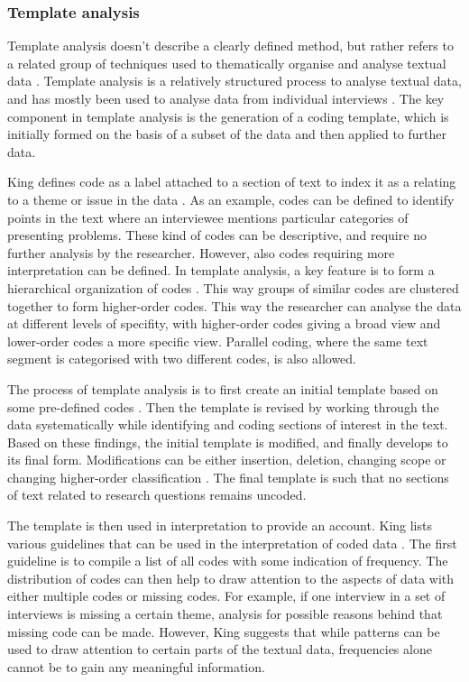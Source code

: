 \documentclass[english]{tktltiki2}
\theoremstyle{definition}
\theoremstyle{remark}
\begin{document}
\subsubsection{Template analysis}

Template analysis doesn't describe a clearly defined method, but rather refers to a related group of techniques used to thematically organise and analyse textual data \cite{king2004using}. Template analysis is a relatively structured process to analyse textual data, and has mostly been used to analyse data from individual interviews \cite{king2012doing}. The key component in template analysis is the generation of a coding template, which is initially formed on the basis of a subset of the data and then applied to further data. 

King defines code as a label attached to a section of text to index it as a relating to a theme or issue in the data \cite{king2004using}. As an example, codes can be defined to identify points in the text where an interviewee mentions particular categories of presenting problems. These kind of codes can be descriptive, and require no further analysis by the researcher. However, also codes requiring more interpretation can be defined. In template analysis, a key feature is to form a hierarchical organization of codes \cite{king2004using}. This way groups of similar codes are clustered together to form higher-order codes. This way the researcher can analyse the data at different levels of specifity, with higher-order codes giving a broad view and lower-order codes a more specific view. Parallel coding, where the same text segment is categorised with two different codes, is also allowed. 

The process of template analysis is to first create an initial template based on some pre-defined codes \cite{king2004using}. Then the template is revised by working through the data systematically while identifying and coding sections of interest in the text. Based on these findings, the initial template is modified, and finally develops to its final form. Modifications can be either insertion, deletion, changing scope or changing higher-order classification \cite{king2004using}. The final template is such that no sections of text related to research questions remains uncoded. 

The template is then used in interpretation to provide an account. King lists various guidelines that can be used in the interpretation of coded data \cite{king2004using}. The first guideline is to compile a list of all codes with some indication of frequency. The distribution of codes can then help to draw attention to the aspects of data with either multiple codes or missing codes. For example, if one interview in a set of interviews is missing a certain theme, analysis for possible reasons behind that missing code can be made. However, King suggests that while patterns can be used to draw attention to certain parts of the textual data, frequencies alone cannot be to gain any meaningful information. 
\end{document}
